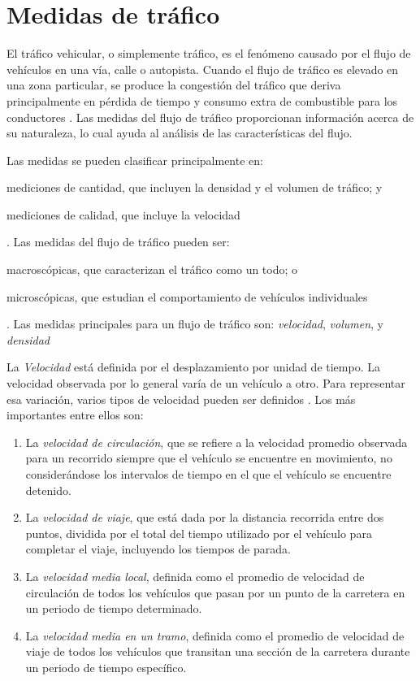 \section{Medidas de tráfico}
\label{sec:medidas_trafico}

El tráfico vehicular, o simplemente tráfico, es el fenómeno causado por el flujo de vehículos en una vía, calle o autopista. Cuando el flujo de tráfico es elevado en una zona particular, se produce la congestión del tráfico que deriva principalmente en pérdida de tiempo y consumo extra de combustible para los conductores \cite{litman2011smart}. Las medidas del flujo de tráfico proporcionan información acerca de su naturaleza, lo cual ayuda al análisis de las características del flujo.

Las medidas se pueden clasificar principalmente en: \begin{enumerate*}[a)]
\item mediciones de cantidad, que incluyen la densidad y el volumen de tráfico; y \item mediciones de calidad, que incluye la velocidad
\end{enumerate*}. Las medidas del flujo de tráfico pueden ser: \begin{enumerate*}[a)] \item macroscópicas, que caracterizan el tráfico como un todo; o \item microscópicas, que estudian el comportamiento de vehículos individuales \end{enumerate*}. Las medidas principales para un flujo de tráfico son: \emph{velocidad}, \emph{volumen}, y \emph{densidad} \cite{may1990fundamentals}

La \emph{Velocidad} está definida por el desplazamiento por unidad de tiempo. La velocidad observada por lo general varía de un vehículo a otro. Para representar esa variación, varios tipos de velocidad pueden ser definidos \cite{may1990fundamentals}. Los más importantes entre ellos son: 
\begin{enumerate}

\item La \emph{velocidad de circulación}, que se refiere a la velocidad promedio observada para un recorrido siempre que el vehículo se encuentre en movimiento, no considerándose los intervalos de tiempo en el que el vehículo se encuentre detenido.

\item La \emph{velocidad de viaje}, que está dada por la distancia recorrida entre dos puntos, dividida por el total del tiempo utilizado por el vehículo para completar el viaje, incluyendo los tiempos de parada.

\item La \emph{velocidad media local}, definida como el promedio de velocidad de circulación de todos los vehículos que pasan por un punto de la carretera en un periodo de tiempo determinado.

\item La \emph{velocidad media en un tramo}, definida como el promedio de velocidad de viaje de todos los vehículos que transitan una sección de la carretera durante un periodo de tiempo específico.
\end{enumerate}


